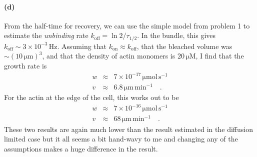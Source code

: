 \documentclass[12pt]{article}
\begin{document}
\paragraph{(d)}

From the half-time for recovery, we can use the simple model from problem 1 to
estimate the \emph{unbinding} rate $k_\mathrm{off} = \ln 2 / \tau_{1/2}$.
In the bundle, this gives $k_\mathrm{off} \sim 3\times 10^{-3} \,\mathrm{Hz}$.
Assuming that $k_\mathrm{on} \approx k_\mathrm{off}$, that the bleached
volume was $\sim (10\,\mathrm{\mu m})^3$, and that the density of actin
monomers is $20\,\mathrm{\mu M}$, I find that the growth rate is
\begin{eqnarray}
w &\approx& 7 \times 10^{-17} \, \mathrm{\mu mol \, s^{-1}} \\
v &\approx& 6.8 \, \mathrm{\mu m\,min^{-1}} \quad.
\end{eqnarray}
For the actin at the edge of the cell, this works out to be
\begin{eqnarray}
w &\approx& 7 \times 10^{-16} \, \mathrm{\mu mol \, s^{-1}} \\
v &\approx& 68 \, \mathrm{\mu m\,min^{-1}} \quad.
\end{eqnarray}
These two results are again much lower than the result estimated in the
diffusion limited case but it all seems a bit hand-wavy to me and changing any
of the assumptions makes a huge difference in the result.


{}

\end{document}
